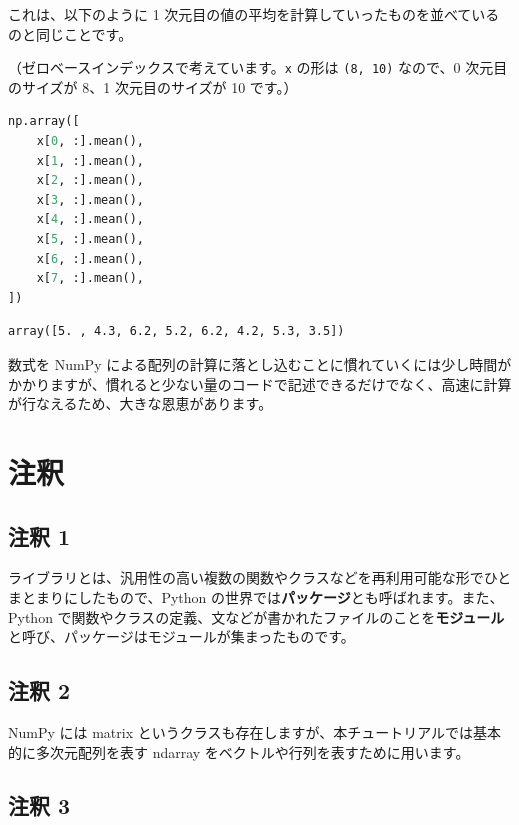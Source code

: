 これは、以下のように 1 次元目の値の平均を計算していったものを並べているのと同じことです。

（ゼロベースインデックスで考えています。\texttt{x} の形は \texttt{(8, 10)} なので、0 次元目のサイズが 8、1 次元目のサイズが 10 です。）


\begin{lstlisting}[style=codecell,language=Python]
np.array([
    x[0, :].mean(),
    x[1, :].mean(),
    x[2, :].mean(),
    x[3, :].mean(),
    x[4, :].mean(),
    x[5, :].mean(),
    x[6, :].mean(),
    x[7, :].mean(),
])
\end{lstlisting}

\begin{lstlisting}[style=outputcell]
array([5. , 4.3, 6.2, 5.2, 6.2, 4.2, 5.3, 3.5])
\end{lstlisting}

数式を NumPy による配列の計算に落とし込むことに慣れていくには少し時間がかかりますが、慣れると少ない量のコードで記述できるだけでなく、高速に計算が行なえるため、大きな恩恵があります。


\section{注釈}


\subsection{注釈 1}
\label{03-reviewing-elementary-math-with-numpy-and-matplotlib-note1}


ライブラリとは、汎用性の高い複数の関数やクラスなどを再利用可能な形でひとまとまりにしたもので、Python の世界では\textbf{パッケージ}とも呼ばれます。また、Python で関数やクラスの定義、文などが書かれたファイルのことを\textbf{モジュール}と呼び、パッケージはモジュールが集まったものです。


\subsection{注釈 2}
\label{03-reviewing-elementary-math-with-numpy-and-matplotlib-note2}


NumPy には matrix というクラスも存在しますが、本チュートリアルでは基本的に多次元配列を表す ndarray をベクトルや行列を表すために用います。


\subsection{注釈 3}
\label{03-reviewing-elementary-math-with-numpy-and-matplotlib-note3}


